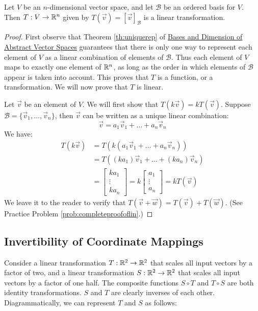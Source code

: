 \documentclass{ximera}
\begin{document}
\begin{theorem}\label{th:coordvectmappinglinear}
Let $V$ be an $n$-dimensional vector space, and let $\mathcal{B}$ be an ordered basis for $V$.  Then  $T:V\rightarrow \mathbb{R}^n$ given by $T(\vec{v})=[\vec{v}]_{\mathcal{B}}$ is a linear transformation.
\end{theorem}
\begin{proof}
First observe that Theorem \ref{th:uniquerep} of \href{https://ximera.osu.edu/linearalgebradzv3/LinearAlgebraInteractiveIntro/VSP-0060/main}{Bases and Dimension of Abstract Vector Spaces} guarantees that there is only one way to represent each element of $V$ as a linear combination of elements of $\mathcal{B}$.  Thus each element of $V$ maps to exactly one element of $\mathbb{R}^n$, as long as the order in which elements of $\mathcal{B}$ appear is taken into account.  This proves that $T$ is a function, or a transformation.  We will now prove that $T$ is linear.

Let $\vec{v}$ be an element of $V$.  We will first show that $T(k\vec{v})=kT(\vec{v})$.  Suppose $\mathcal{B}=\{\vec{v}_1, \ldots ,\vec{v}_n\}$, then $\vec{v}$ can be written as a unique linear combination:
$$\vec{v}=a_1\vec{v}_1+ \ldots +a_n\vec{v}_n$$
We have:
\begin{align*}
    T(k\vec{v})&=T(k(a_1\vec{v}_1+ \ldots +a_n\vec{v}_n))\\
    &=T((ka_1)\vec{v}_1+ \ldots +(ka_n)\vec{v}_n)\\
    &=\begin{bmatrix}ka_1\\\vdots\\ka_n\end{bmatrix}=k\begin{bmatrix}a_1\\\vdots\\a_n\end{bmatrix}=kT(\vec{v})
\end{align*}
We leave it to the reader to verify that $T(\vec{v}+\vec{w})=T(\vec{v})+T(\vec{w})$.  (See Practice Problem \ref{prob:completeproofoflin}.)
\end{proof}

\subsection*{Invertibility of Coordinate Mappings}
Consider a linear transformation $T:\mathbb{R}^2\rightarrow \mathbb{R}^2$ that scales all input vectors by a factor of two, and a linear transformation $S:\mathbb{R}^2\rightarrow \mathbb{R}^2$ that scales all input vectors by a factor of one half.  The composite functions $S\circ T$ and $T\circ S$ are both identity transformations.  $S$ and $T$ are clearly inverses of each other.  Diagrammatically, we can represent $T$ and $S$ as follows:
 
\end{document}

